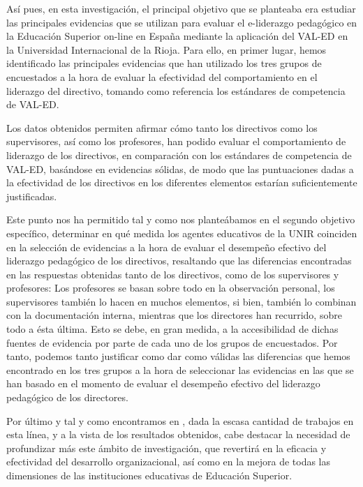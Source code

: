 \documentclass[spanish]{textolivre}
\begin{document}
Así pues, en esta investigación, el principal objetivo que se planteaba era estudiar las principales evidencias que se utilizan para evaluar el e-liderazgo pedagógico en la Educación Superior on-line en España mediante la aplicación del VAL-ED en la Universidad Internacional de la Rioja. Para ello, en primer lugar, hemos identificado las principales evidencias que han utilizado los tres grupos de encuestados a la hora de evaluar la efectividad del comportamiento en el liderazgo del directivo, tomando como referencia los estándares de competencia de VAL-ED.

Los datos obtenidos permiten afirmar cómo tanto los directivos como los supervisores, así como los profesores, han podido evaluar el comportamiento de liderazgo de los directivos, en comparación con los estándares de competencia de VAL-ED, basándose en evidencias sólidas, de modo que las puntuaciones dadas a la efectividad de los directivos en los diferentes elementos estarían suficientemente justificadas.

Este punto nos ha permitido tal y como nos planteábamos en el segundo objetivo específico, determinar en qué medida los agentes educativos de la UNIR coinciden en la selección de evidencias a la hora de evaluar el desempeño efectivo del liderazgo pedagógico de los directivos, resaltando que las diferencias encontradas en las respuestas obtenidas tanto de los directivos, como de los supervisores y profesores: Los profesores se basan sobre todo en la observación personal, los supervisores también lo hacen en muchos elementos, si bien, también lo combinan con la documentación interna, mientras que los directores han recurrido, sobre todo a ésta última. Esto se debe, en gran medida, a la accesibilidad de dichas fuentes de evidencia por parte de cada uno de los grupos de encuestados. Por tanto, podemos tanto justificar como dar como válidas las diferencias que hemos encontrado en los tres grupos a la hora de seleccionar las evidencias en las que se han basado en el momento de evaluar el desempeño efectivo del liderazgo pedagógico de los directores.

Por último y tal y como encontramos en \textcite{palomino2022}, dada la escasa cantidad de trabajos en esta línea, y a la vista de los resultados obtenidos, cabe destacar la necesidad de profundizar más este ámbito de investigación, que revertirá en la eficacia y efectividad del desarrollo organizacional, así como en la mejora de todas las dimensiones de las instituciones educativas de Educación Superior. 
\end{document}
